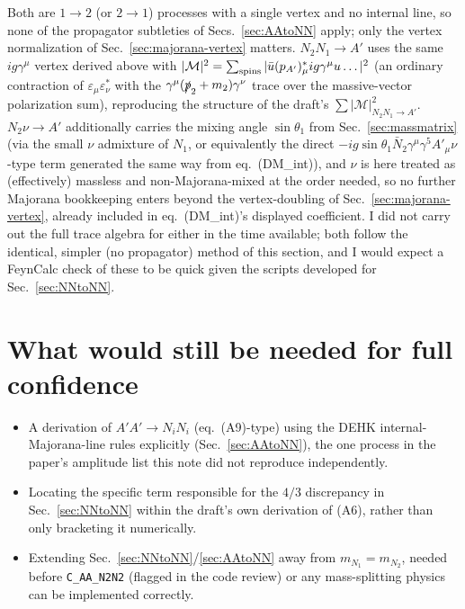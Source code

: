 \documentclass[11pt,a4paper]{article}
\newcommand{\Msq}{|\mathcal{M}|^2}
\newcommand{\code}[1]{\texttt{#1}}
\newcommand{\Ap}{A'}
\begin{document}
Both are $1\to2$ (or $2\to1$) processes with a single vertex and no internal
line, so none of the propagator subtleties of Secs.~\ref{sec:AAtoNN} apply;
only the vertex normalization of Sec.~\ref{sec:majorana-vertex} matters.
$N_2N_1\to\Ap$ uses the same $ig\gamma^\mu$ vertex derived above with
$\Msq=\sum_{\rm spins}|\bar u(p_{A'})^*_\mu ig\gamma^\mu u\ldots|^2$ (an
ordinary contraction of $\varepsilon_\mu\varepsilon_\nu^*$ with the
$\gamma^\mu(\slashed p_2+m_2)\gamma^\nu$ trace over the massive-vector
polarization sum), reproducing the structure of the draft's
$\sum\Msq_{N_2N_1\to\Ap}$. $N_2\nu\to\Ap$ additionally carries the mixing
angle $\sin\theta_1$ from Sec.~\ref{sec:massmatrix} (via the small $\nu$
admixture of $N_1$, or equivalently the direct $-ig\sin\theta_1\bar
N_2\gamma^\mu\gamma^5A'_\mu\nu$-type term generated the same way from
eq.~(DM\_int)), and $\nu$ is here treated as (effectively) massless and
non-Majorana-mixed at the order needed, so no further Majorana bookkeeping
enters beyond the vertex-doubling of Sec.~\ref{sec:majorana-vertex}, already
included in eq.~(DM\_int)'s displayed coefficient. I did not carry out the
full trace algebra for either in the time available; both follow the
identical, simpler (no propagator) method of this section, and I would
expect a FeynCalc check of these to be quick given the scripts developed for
Sec.~\ref{sec:NNtoNN}.

\section{What would still be needed for full confidence}
\begin{itemize}
  \item A derivation of $\Ap\Ap\to N_iN_i$ (eq.~(A9)-type) using the DEHK
    internal-Majorana-line rules explicitly (Sec.~\ref{sec:AAtoNN}), the one
    process in the paper's amplitude list this note did not reproduce
    independently.
  \item Locating the specific term responsible for the $4/3$ discrepancy in
    Sec.~\ref{sec:NNtoNN} within the draft's own derivation of (A6), rather
    than only bracketing it numerically.
  \item Extending Sec.~\ref{sec:NNtoNN}/\ref{sec:AAtoNN} away from
    $m_{N_1}=m_{N_2}$, needed before \code{C\_AA\_N2N2} (flagged in the code
    review) or any mass-splitting physics can be implemented correctly.
\end{itemize}
\end{document}
